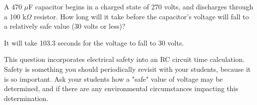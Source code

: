 

A 470 $\mu$F capacitor begins in a charged state of 270 volts, and discharges through a 100 k$\Omega$ resistor.  How long will it take before the capacitor's voltage will fall to a relatively safe value (30 volts or less)?







It will take 103.3 seconds for the voltage to fall to 30 volts.







This question incorporates electrical safety into an RC circuit time calculation.  Safety is something you should periodically revisit with your students, because it is so important.  Ask your students how a "safe" value of voltage may be determined, and if there are any environmental circumstances impacting this determination.




